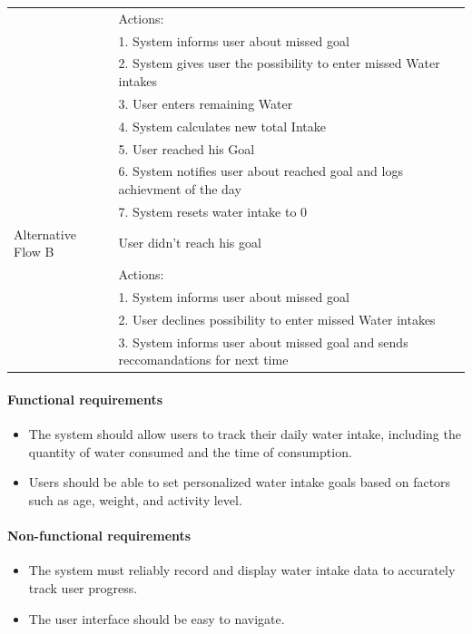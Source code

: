 \documentclass{article}
\begin{document}
\begin{table}[h!]
\begin{tabularx}{\textwidth}{|>{\raggedright\arraybackslash}p{}|X|}
                         & Actions: \\
                         & 1. System informs user about missed goal\\
                         & 2. System gives user the possibility to enter missed Water intakes \\ 
                         & 3. User enters remaining Water\\
                         & 4. System calculates new total Intake\\
                         & 5. User reached his Goal\\ 
                         & 6. System notifies user about reached goal and logs achievment of the day\\
                         & 7. System resets water intake to 0 \\ \hline
        Alternative Flow B & User didn't reach his goal\\
                         & Actions: \\
                         & 1. System informs user about missed goal \\
                         & 2. User declines possibility to enter missed Water intakes\\
                         & 3. System informs user about missed goal and sends reccomandations for next time \\ \hline
    \end{tabularx}
\end{table}
	
\paragraph{Functional requirements}
		\begin{itemize}
			\item  The system should allow users to track their daily water intake, including the quantity of water consumed and the time of consumption.
			\item  Users should be able to set personalized water intake goals based on factors such as age, weight, and activity level.
		\end{itemize}
		
	\paragraph{Non-functional requirements}
		\begin{itemize}
			\item The system must reliably record and display water intake data to accurately track user progress.
			\item The user interface should be easy to navigate.
		\end{itemize}
\end{document}
